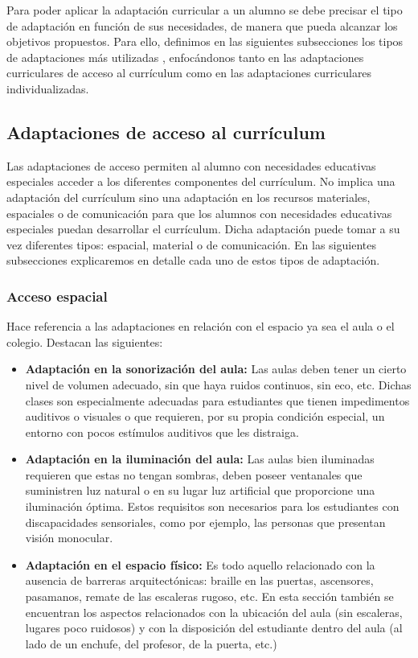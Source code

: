 Para poder aplicar la adaptación curricular a un alumno se debe precisar el tipo de adaptación en función de sus necesidades, de manera que pueda alcanzar los objetivos propuestos. Para ello, definimos en las siguientes subsecciones los tipos de adaptaciones más utilizadas \citep*{adaptacionUNED}, enfocándonos tanto en las adaptaciones curriculares de acceso al currículum como en las adaptaciones curriculares individualizadas.

\subsection{Adaptaciones de acceso al currículum}
\label{adaptacionesAcceso}
Las adaptaciones de acceso permiten al alumno con necesidades educativas especiales acceder a los diferentes componentes del currículum. No implica una adaptación del currículum sino una adaptación en los recursos materiales, espaciales o de comunicación para que los alumnos con necesidades educativas especiales puedan desarrollar el currículum. Dicha adaptación puede tomar a su vez diferentes tipos: espacial, material o de comunicación. En las siguientes subsecciones explicaremos en detalle cada uno de estos tipos de adaptación.

\subsubsection{Acceso espacial}
Hace referencia a las adaptaciones en relación con el espacio ya sea el aula o el colegio. Destacan las siguientes:
\begin{itemize}
    \item \textbf{Adaptación en la sonorización del aula:} Las aulas deben tener un cierto nivel de volumen adecuado, sin que haya ruidos continuos, sin eco, etc. Dichas clases son especialmente adecuadas para estudiantes que tienen impedimentos auditivos o visuales o que requieren, por su propia condición especial, un entorno con pocos estímulos auditivos que les distraiga.
    \item \textbf{Adaptación en la iluminación del aula:} Las aulas bien iluminadas requieren que estas no tengan sombras, deben poseer ventanales que suministren luz natural o en su lugar luz artificial que proporcione una iluminación óptima. Estos requisitos son necesarios para los estudiantes con discapacidades sensoriales, como por ejemplo, las personas que presentan visión monocular.
    \item \textbf{Adaptación en el espacio físico:} Es todo aquello relacionado con la ausencia de barreras arquitectónicas:  braille en las puertas, ascensores, pasamanos, remate de las escaleras rugoso, etc. En esta sección también se encuentran los aspectos relacionados con la ubicación del aula (sin escaleras, lugares poco ruidosos) y con la disposición del estudiante dentro del aula (al lado de un enchufe, del profesor, de la puerta, etc.)
\end{itemize}

